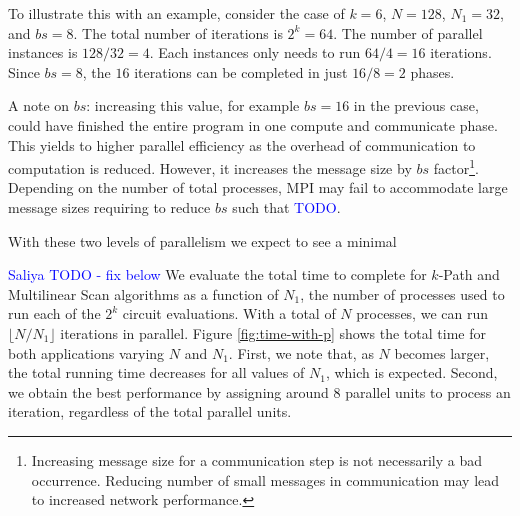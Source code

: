 To illustrate this with an example, consider the case of $k=6$, $N=128$, $N_1=32$, and $bs=8$. The total number of iterations is $2^k = 64$. The number of parallel instances is $128/32 = 4$. Each instances only needs to run $64/4 = 16$ iterations. Since $bs=8$, the $16$ iterations can be completed in just $16/8 = 2$ phases.

A note on $bs$: increasing this value, for example $bs=16$ in the previous case, could have finished the entire program in one compute and communicate phase. This yields to higher parallel efficiency as the overhead of communication to computation is reduced. However, it increases the message size by $bs$ factor\footnote{Increasing message size for a communication step is not necessarily a bad occurrence. Reducing number of small messages in communication may lead to increased network performance.}. Depending on the number of total processes, MPI may fail to accommodate large message sizes requiring to reduce  $bs$ such that \textcolor{blue}{TODO}. 

With these two levels of parallelism we expect to see a minimal

\textcolor{blue}{Saliya TODO - fix below}
We evaluate the total time to complete for $k$-Path and Multilinear 
Scan algorithms as a function of $N_1$, the number of processes used to run 
each of the $2^k$ circuit evaluations. With a total of $N$ processes, we can run 
$\lfloor N / N_1 \rfloor$ iterations in parallel. Figure \ref{fig:time-with-p} shows the total time for both applications varying $N$ and $N_1$. First, we note that, as $N$ becomes larger, the total running time decreases for all values of $N_1$, which is expected. Second, we obtain the best performance by assigning around 8 parallel units to process an iteration, regardless of the total parallel units.

%


